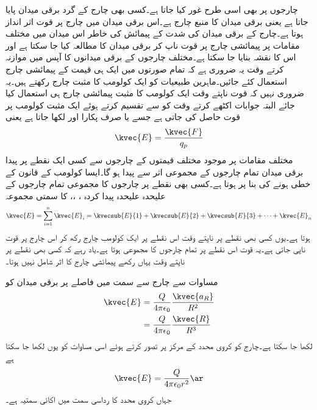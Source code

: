 چارجوں پر بھی اسی طرح غور کیا جاتا ہے۔کسی بھی چارج  کے گرد برقی میدان پایا جاتا ہے یعنی برقی میدان کا منبع چارج ہے۔اس برقی میدان میں چارج پر قوت اثر انداز ہوتا ہے۔چارج  کے برقی میدان کی شدت کے پیمائش کی خاطر اس میدان میں مختلف مقامات پر پیمائشی چارج   پر قوت  ناپ کر برقی میدان کا مطالعہ کیا جا سکتا ہے اور اس کا نقشہ بنایا جا سکتا ہے۔مختلف چارجوں کے برقی میدانوں کا آپس میں موازنہ کرتے وقت یہ ضروری ہے کہ تمام صورتوں میں ایک ہی قیمت کے پیمائشی چارج  استعمال کئے جائیں۔ماہرین طبیعیات  کو ایک کولومب کا مثبت چارج  رکھتے ہیں۔یہ ضروری نہیں کہ قوت ناپتے وقت ایک کولومب کا مثبت پیمائشی چارج ہی استعمال کیا جائے البتہ جوابات اکٹھے کرتے وقت  کو  سے تقسیم کرتے ہوئے ایک مثبت کولومب پر قوت حاصل کی جاتی ہے جسے  یا صرف  پکارا اور  لکھا جاتا ہے یعنی
\begin{align}\label{مساوات_کولومب_برقی_شدت_اور_قوت}
\kvec{E}=\frac{\kvec{F}}{q_p}
\end{align}
مختلف مقامات پر موجود مختلف قیمتوں کے چارجوں سے کسی ایک نقطے پر  پیدا برقی میدان  تمام چارجوں کے مجموعی اثر سے پیدا ہو گا۔ایسا کولومب کے قانون کے خطی ہونے کی بنا پر ہوتا ہے۔کسی بھی نقطے پر  چارجوں کا مجموعی  تمام چارجوں کے علیحدہ علیحدہ پیدا کردہ  ،  ،،  کا سمتی مجموعہ
\begin{align}
\kvec{E}=\sum_{i=1}^n \kvec{E}_i=\kvecsub{E}{1}+\kvecsub{E}{2}+\kvecsub{E}{3}+\cdots+\kvec{E}_n 
\end{align}
 ہوتا ہے۔یوں کسی بھی نقطے   پر  ناپتے وقت اس نقطے پر ایک کولومب چارج  رکھ کر اس چارج پر قوت ناپی جاتی ہے۔یہ قوت اس نقطے پر تمام چارجوں کا مجموعی   ہوتا ہے۔یاد رہے کہ کسی بھی نقطے پر   ناپتے وقت یہاں رکھے پیمائشی چارج  کا اثر شامل نہیں ہوتا۔

مساوات   سے  چارج  سے  سمت میں  فاصلے پر برقی میدان کو
\begin{gather}
\begin{aligned}\label{مساوات_کولومب_قوت_کی_عمومی_مساوات}
\kvec{E}&=\frac{Q}{4 \pi \epsilon_0}\frac{\kvec{a_{R}}}{ R^2}\\
&=\frac{Q}{4 \pi \epsilon_0}\frac{\kvec{R}}{ R^3}
\end{aligned}
\end{gather}
لکھا جا سکتا ہے۔چارج کو کروی محدد کے مرکز پر تصور کرتے ہوئے اسی مساوات کو یوں لکھا جا سکتا ہے
\begin{align}\label{مساوات_کولومب_نقطہ_چارج_کروی_رداس_پر_تبدیل_نہیں_ہوتا}
\kvec{E}=\frac{Q}{4 \pi \epsilon_0 r^2} \ar
\end{align}
جہاں    کروی محدد کا رداسی سمت میں اکائی سمتیہ ہے۔

